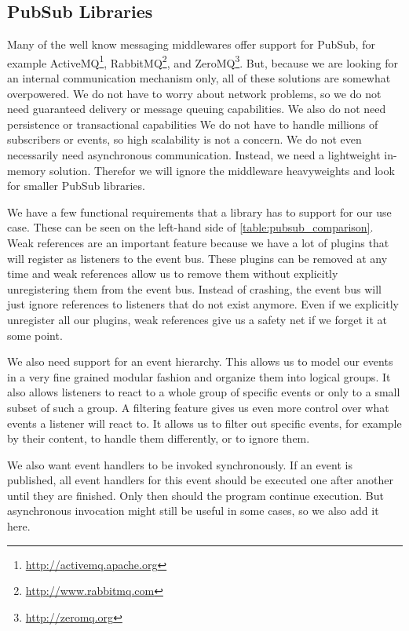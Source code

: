 \subsection{PubSub Libraries}
\label{implementation:selecting:pubsub}

Many of the well know messaging middlewares offer support for PubSub, for example ActiveMQ\footnote{\url{http://activemq.apache.org}}, RabbitMQ\footnote{\url{http://www.rabbitmq.com}}, and ZeroMQ\footnote{\url{http://zeromq.org}}.
But, because we are looking for an internal communication mechanism only, all of these solutions are somewhat overpowered.
We do not have to worry about network problems, so we do not need guaranteed delivery or message queuing capabilities.
We also do not need persistence or transactional capabilities
We do not have to handle millions of subscribers or events, so high scalability is not a concern.
We do not even necessarily need asynchronous communication.
Instead, we need a lightweight in-memory solution.
Therefor we will ignore the middleware heavyweights and look for smaller PubSub libraries.

We have a few functional requirements that a library has to support for our use case.
These can be seen on the left-hand side of \autoref{table:pubsub_comparison}.
Weak references are an important feature because we have a lot of plugins that will register as listeners to the event bus.
These plugins can be removed at any time and weak references allow us to remove them without explicitly unregistering them from the event bus.
Instead of crashing, the event bus will just ignore references to listeners that do not exist anymore.
Even if we explicitly unregister all our plugins, weak references give us a safety net if we forget it at some point.

We also need support for an event hierarchy.
This allows us to model our events in a very fine grained modular fashion and organize them into logical groups.
It also allows listeners to react to a whole group of specific events or only to a small subset of such a group.
A filtering feature gives us even more control over what events a listener will react to.
It allows us to filter out specific events, for example by their content, to handle them differently, or to ignore them.

We also want event handlers to be invoked synchronously.
If an event is published, all event handlers for this event should be executed one after another until they are finished.
Only then should the program continue execution.
But asynchronous invocation might still be useful in some cases, so we also add it here.


